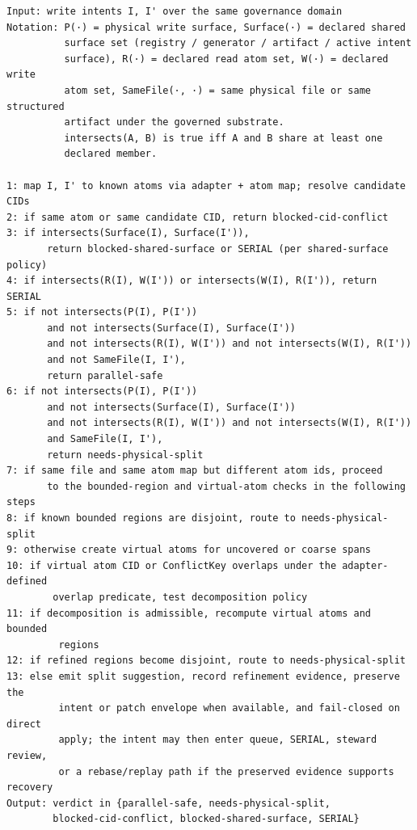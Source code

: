 \documentclass[9pt,letterpaper]{extarticle}
\begin{document}
\begin{paperAlgoBox}
\par\smallskip

\begin{Verbatim}[breaklines=true,fontsize=\scriptsize]
Input: write intents I, I' over the same governance domain
Notation: P(·) = physical write surface, Surface(·) = declared shared
          surface set (registry / generator / artifact / active intent
          surface), R(·) = declared read atom set, W(·) = declared write
          atom set, SameFile(·, ·) = same physical file or same structured
          artifact under the governed substrate.
          intersects(A, B) is true iff A and B share at least one
          declared member.

1: map I, I' to known atoms via adapter + atom map; resolve candidate CIDs
2: if same atom or same candidate CID, return blocked-cid-conflict
3: if intersects(Surface(I), Surface(I')),
       return blocked-shared-surface or SERIAL (per shared-surface policy)
4: if intersects(R(I), W(I')) or intersects(W(I), R(I')), return SERIAL
5: if not intersects(P(I), P(I'))
       and not intersects(Surface(I), Surface(I'))
       and not intersects(R(I), W(I')) and not intersects(W(I), R(I'))
       and not SameFile(I, I'),
       return parallel-safe
6: if not intersects(P(I), P(I'))
       and not intersects(Surface(I), Surface(I'))
       and not intersects(R(I), W(I')) and not intersects(W(I), R(I'))
       and SameFile(I, I'),
       return needs-physical-split
7: if same file and same atom map but different atom ids, proceed
       to the bounded-region and virtual-atom checks in the following steps
8: if known bounded regions are disjoint, route to needs-physical-split
9: otherwise create virtual atoms for uncovered or coarse spans
10: if virtual atom CID or ConflictKey overlaps under the adapter-defined
        overlap predicate, test decomposition policy
11: if decomposition is admissible, recompute virtual atoms and bounded
         regions
12: if refined regions become disjoint, route to needs-physical-split
13: else emit split suggestion, record refinement evidence, preserve the
         intent or patch envelope when available, and fail-closed on direct
         apply; the intent may then enter queue, SERIAL, steward review,
         or a rebase/replay path if the preserved evidence supports recovery
Output: verdict in {parallel-safe, needs-physical-split,
        blocked-cid-conflict, blocked-shared-surface, SERIAL}
\end{Verbatim}
\end{paperAlgoBox}
\end{document}
